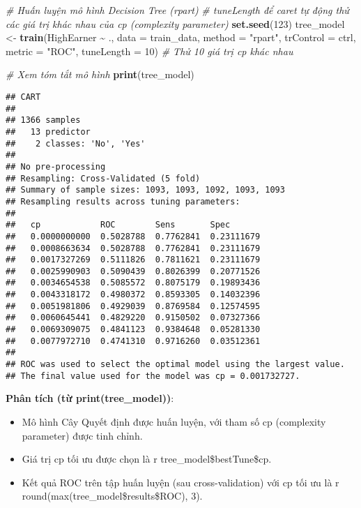 \documentclass[
]{article}
\newenvironment{Shaded}{\begin{snugshade}}{\end{snugshade}}
\newcommand{\AttributeTok}[1]{\textcolor[rgb]{0.13,0.29,0.53}{#1}}
\newcommand{\CommentTok}[1]{\textcolor[rgb]{0.56,0.35,0.01}{\textit{#1}}}
\newcommand{\DecValTok}[1]{\textcolor[rgb]{0.00,0.00,0.81}{#1}}
\newcommand{\FunctionTok}[1]{\textcolor[rgb]{0.13,0.29,0.53}{\textbf{#1}}}
\newcommand{\NormalTok}[1]{#1}
\newcommand{\OtherTok}[1]{\textcolor[rgb]{0.56,0.35,0.01}{#1}}
\newcommand{\SpecialCharTok}[1]{\textcolor[rgb]{0.81,0.36,0.00}{\textbf{#1}}}
\newcommand{\StringTok}[1]{\textcolor[rgb]{0.31,0.60,0.02}{#1}}
\begin{document}
\begin{Shaded}
\begin{Highlighting}[]
\CommentTok{\# Huấn luyện mô hình Decision Tree (rpart)}
\CommentTok{\# \textasciigrave{}tuneLength\textasciigrave{} để caret tự động thử các giá trị khác nhau của cp (complexity parameter)}
\FunctionTok{set.seed}\NormalTok{(}\DecValTok{123}\NormalTok{)}
\NormalTok{tree\_model }\OtherTok{\textless{}{-}} \FunctionTok{train}\NormalTok{(HighEarner }\SpecialCharTok{\textasciitilde{}}\NormalTok{ ., }
                    \AttributeTok{data =}\NormalTok{ train\_data, }
                    \AttributeTok{method =} \StringTok{"rpart"}\NormalTok{, }
                    \AttributeTok{trControl =}\NormalTok{ ctrl,}
                    \AttributeTok{metric =} \StringTok{"ROC"}\NormalTok{,}
                    \AttributeTok{tuneLength =} \DecValTok{10}\NormalTok{) }\CommentTok{\# Thử 10 giá trị cp khác nhau}

\CommentTok{\# Xem tóm tắt mô hình}
\FunctionTok{print}\NormalTok{(tree\_model)}
\end{Highlighting}
\end{Shaded}

\begin{verbatim}
## CART 
## 
## 1366 samples
##   13 predictor
##    2 classes: 'No', 'Yes' 
## 
## No pre-processing
## Resampling: Cross-Validated (5 fold) 
## Summary of sample sizes: 1093, 1093, 1092, 1093, 1093 
## Resampling results across tuning parameters:
## 
##   cp            ROC        Sens       Spec      
##   0.0000000000  0.5028788  0.7762841  0.23111679
##   0.0008663634  0.5028788  0.7762841  0.23111679
##   0.0017327269  0.5111826  0.7811621  0.23111679
##   0.0025990903  0.5090439  0.8026399  0.20771526
##   0.0034654538  0.5085572  0.8075179  0.19893436
##   0.0043318172  0.4980372  0.8593305  0.14032396
##   0.0051981806  0.4929039  0.8769584  0.12574595
##   0.0060645441  0.4829220  0.9150502  0.07327366
##   0.0069309075  0.4841123  0.9384648  0.05281330
##   0.0077972710  0.4741310  0.9716260  0.03512361
## 
## ROC was used to select the optimal model using the largest value.
## The final value used for the model was cp = 0.001732727.
\end{verbatim}

\textbf{Phân tích (từ print(tree\_model))}:

\begin{itemize}
\item
  Mô hình Cây Quyết định được huấn luyện, với tham số cp (complexity
  parameter) được tinh chỉnh.
\item
  Giá trị cp tối ưu được chọn là r tree\_model\$bestTune\$cp.
\item
  Kết quả ROC trên tập huấn luyện (sau cross-validation) với cp tối ưu
  là r round(max(tree\_model\$results\$ROC), 3).
\end{itemize}
\end{document}
